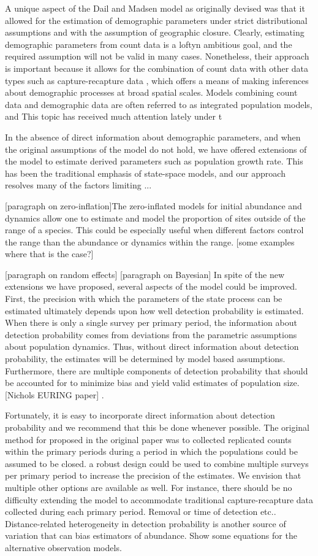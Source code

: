 \documentclass{article}
\begin{document}
A unique aspect of the Dail and Madsen model as originally devised was
that it allowed for the estimation of demographic parameters under
strict distributional assumptions and with the assumption of
geographic closure. Clearly, estimating demographic parameters from
count data is a loftyn ambitious goal, and the required assumption
will not be valid in many cases. Nonetheless, their approach is
important because it allows for the combination of count data with
other data types such as capture-recapture data , which offers a
means of making inferences about demographic processes at broad
spatial scales. Models combining count data and demographic data are
often referred to as integrated population models, and This topic has
received much attention lately under t

In the absence of direct information about demographic parameters, and
when the original assumptions of the model do not hold, we have
offered extensions of the model to estimate derived parameters such as
population growth rate. This has been the traditional emphasis of
state-space models, and our approach resolves many of the factors
limiting ...

[paragraph on zero-inflation]The zero-inflated models for initial
abundance and dynamics allow one to estimate and model the proportion
of sites outside of the range of a species.  This could be especially
useful when different factors control the range than the abundance or
dynamics within the range.  [some examples where that is the case?]

 [paragraph on random effects]
[paragraph on Bayesian]
In spite of the new extensions we have proposed, several aspects of
the model could be improved. First, the precision with which the
parameters of the state process can be estimated ultimately depends
upon how well detection probability is estimated. When there is only a
single survey per primary period, the information about detection
probability comes from deviations from the parametric assumptions
about population dynamics. Thus, without direct information about
detection probability, the estimates will be determined by model based
assumptions. Furthermore, there are multiple components of detection
probability that should be accounted for to minimize bias and yield
valid estimates of population size. [Nichols EURING paper] .

Fortunately, it is easy to incorporate direct information about
detection probability and we recommend that this be done whenever
possible. The original method for proposed in the original paper was
to collected replicated counts within the primary periods during a
period in which the populations could be assumed to be closed.  a
robust design could be used to combine multiple surveys per primary
period to increase the precision of the estimates. We envision that
multiple other options are available as well. For instance, there
should be no difficulty extending the model to accommodate traditional
capture-recapture data collected during each primary period. Removal
or time of detection etc.. Distance-related heterogeneity in detection
probability is another source of variation that can bias estimators of
abundance.   Show some equations for the alternative observation
models.
\end{document}
